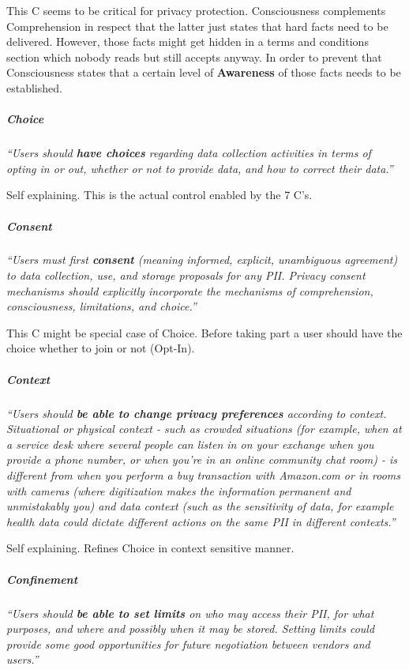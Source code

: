 This C seems to be critical for privacy protection. Consciousness
complements Comprehension in respect that the latter just states that
hard facts need to be delivered. However, those facts might get hidden
in a terms and conditions section which nobody reads but still accepts
anyway. In order to prevent that Consciousness states that a certain
level of \textbf{Awareness} of those facts needs to be established.

\subparagraph{Choice}

\emph{``Users should \textbf{have choices} regarding data collection
activities in terms of opting in or out, whether or not to provide data,
and how to correct their data.''}

Self explaining. This is the actual control enabled by the 7 C's.

\subparagraph{Consent}

\emph{``Users must first \textbf{consent} (meaning informed, explicit,
unambiguous agreement) to data collection, use, and storage proposals
for any PII. Privacy consent mechanisms should explicitly incorporate
the mechanisms of comprehension, consciousness, limitations, and
choice.''}

This C might be special case of Choice. Before taking part a user should
have the choice whether to join or not (Opt-In).

\subparagraph{Context}

\emph{``Users should \textbf{be able to change privacy preferences}
according to context. Situational or physical context - such as crowded
situations (for example, when at a service desk where several people
can listen in on your exchange when you provide a phone number, or when
you're in an online community chat room) - is different from when you
perform a buy transaction with Amazon.com or in rooms with cameras
(where digitization makes the information permanent and unmistakably
you) and data context (such as the sensitivity of data, for example
health data could dictate different actions on the same PII in different
contexts.''}

Self explaining. Refines Choice in context sensitive manner.

\subparagraph{Confinement}

\emph{``Users should \textbf{be able to set limits} on who may access
their PII, for what purposes, and where and possibly when it may be
stored. Setting limits could provide some good opportunities for future
negotiation between vendors and users.''}

